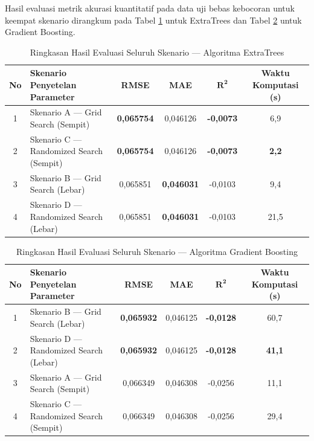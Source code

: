 \documentclass[10pt,a4paper]{article}
\begin{document}
Hasil evaluasi metrik akurasi kuantitatif pada data uji bebas kebocoran untuk keempat skenario dirangkum pada Tabel \ref{tab:hasil_skenario_extratrees} untuk ExtraTrees dan Tabel \ref{tab:hasil_skenario_gb} untuk Gradient Boosting.

\begin{table}[htbp]
  \centering
  \caption{Ringkasan Hasil Evaluasi Seluruh Skenario --- Algoritma ExtraTrees}
  \label{tab:hasil_skenario_extratrees}
  \fontsize{8.5pt}{11pt}\selectfont
  \begin{tabular}{clcccc}
    \toprule
    \textbf{No} & \textbf{Skenario Penyetelan Parameter} & \textbf{RMSE} & \textbf{MAE} & $\mathbf{R^2}$ & \textbf{Waktu Komputasi (s)} \\
    \midrule
    1 & Skenario A --- Grid Search (Sempit) & \textbf{0,065754} & 0,046126 & \textbf{-0,0073} & 6,9 \\
    2 & Skenario C --- Randomized Search (Sempit) & \textbf{0,065754} & 0,046126 & \textbf{-0,0073} & \textbf{2,2} \\
    3 & Skenario B --- Grid Search (Lebar) & 0,065851 & \textbf{0,046031} & -0,0103 & 9,4 \\
    4 & Skenario D --- Randomized Search (Lebar) & 0,065851 & \textbf{0,046031} & -0,0103 & 21,5 \\
    \bottomrule
  \end{tabular}
\end{table}

\begin{table}[htbp]
  \centering
  \caption{Ringkasan Hasil Evaluasi Seluruh Skenario --- Algoritma Gradient Boosting}
  \label{tab:hasil_skenario_gb}
  \fontsize{8.5pt}{11pt}\selectfont
  \begin{tabular}{clcccc}
    \toprule
    \textbf{No} & \textbf{Skenario Penyetelan Parameter} & \textbf{RMSE} & \textbf{MAE} & $\mathbf{R^2}$ & \textbf{Waktu Komputasi (s)} \\
    \midrule
    1 & Skenario B --- Grid Search (Lebar) & \textbf{0,065932} & 0,046125 & \textbf{-0,0128} & 60,7 \\
    2 & Skenario D --- Randomized Search (Lebar) & \textbf{0,065932} & 0,046125 & \textbf{-0,0128} & \textbf{41,1} \\
    3 & Skenario A --- Grid Search (Sempit) & 0,066349 & 0,046308 & -0,0256 & 11,1 \\
    4 & Skenario C --- Randomized Search (Sempit) & 0,066349 & 0,046308 & -0,0256 & 29,4 \\
    \bottomrule
  \end{tabular}
\end{table}
\end{document}
